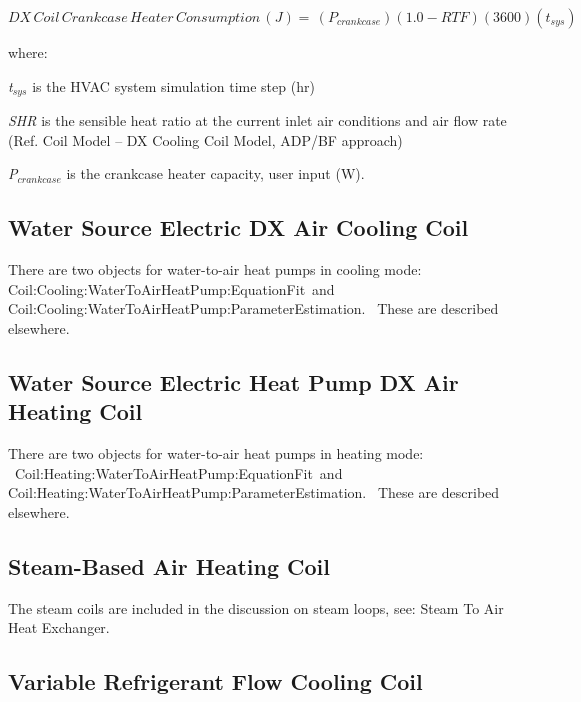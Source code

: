 \begin{equation}
DX\,Coil\,Crankcase\,Heater\,Consumption\,(J) = \,\left( {{P_{crankcase}}} \right)\left( {1.0 - RTF} \right)\left( {3600} \right)\left( {{t_{sys}}} \right)
\end{equation}

where:

\emph{t\(_{sys}\)} is the HVAC system simulation time step (hr)

\emph{SHR} is the sensible heat ratio at the current inlet air conditions and air flow rate (Ref. Coil Model -- DX Cooling Coil Model, ADP/BF approach)

\emph{P\(_{crankcase}\)} is the crankcase heater capacity, user input (W).

\subsection{Water Source Electric DX Air Cooling Coil}\label{water-source-electric-dx-air-cooling-coil}

There are two objects for water-to-air heat pumps in cooling mode: \\ Coil:Cooling:WaterToAirHeatPump:EquationFit~and~\\
Coil:Cooling:WaterToAirHeatPump:ParameterEstimation.~ These are described elsewhere.

\subsection{Water Source Electric Heat Pump DX Air Heating Coil}\label{water-source-electric-heat-pump-dx-air-heating-coil}

There are two objects for water-to-air heat pumps in heating mode: \\ ~Coil:Heating:WaterToAirHeatPump:EquationFit~and~\\
Coil:Heating:WaterToAirHeatPump:ParameterEstimation.~ These are described elsewhere.

\subsection{Steam-Based Air Heating Coil}\label{steam-based-air-heating-coil}

The steam coils are included in the discussion on steam loops, see: Steam To Air Heat Exchanger.

\subsection{Variable Refrigerant Flow Cooling Coil}\label{variable-refrigerant-flow-cooling-coil}

